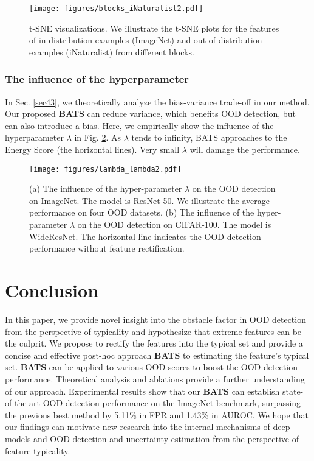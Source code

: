 \documentclass{article}
\begin{document}
\begin{figure}[htbp]
\centering
\texttt{[image: figures/blocks\_iNaturalist2.pdf]}
\vspace{-0.4cm}
\caption{t-SNE visualizations. We illustrate the t-SNE plots for the features of in-distribution examples (ImageNet) and out-of-distribution examples (iNaturalist) from different blocks.}
\label{img:blocks_inaturalist}
\end{figure}

\subsubsection{The influence of the hyperparameter}\label{sec:influence}

In Sec. \ref{sec43}, we theoretically analyze the bias-variance trade-off in our method. 
{Our proposed \textbf{BATS} can reduce variance, which benefits OOD detection, but can also introduce a bias.}
Here, we empirically show the influence of the hyperparameter $\lambda$ in Fig. \ref{img:lambda_lambda}. As $\lambda$ tends to infinity, BATS approaches to the Energy Score (the horizontal lines). Very small $\lambda$ will damage the performance. 

\begin{figure}[htbp]
\centering
\texttt{[image: figures/lambda\_lambda2.pdf]}
\vspace{-0.3cm}
\caption{(a) The influence of the hyper-parameter $\lambda$ on the OOD detection on ImageNet. The model is ResNet-50. We illustrate the average performance on four OOD datasets. (b) The influence of the hyper-parameter $\lambda$ on the OOD detection on CIFAR-100. The model is WideResNet. The horizontal line indicates the OOD detection performance without feature rectification.}
\vspace{-0.3cm}
\label{img:lambda_lambda}
\end{figure}





\section{Conclusion}\label{Conclusion}

In this paper, we provide novel insight into the obstacle factor in OOD detection from the perspective of typicality and hypothesize that extreme features can be the culprit.
We propose to rectify the features into the typical set and provide a concise and effective post-hoc approach \textbf{BATS} to estimating the feature's typical set. \textbf{BATS} can be applied to various OOD scores to boost the OOD detection performance. Theoretical analysis and ablations provide a further understanding of our approach.
Experimental results show that our \textbf{BATS} can establish state-of-the-art OOD detection performance on the ImageNet benchmark, surpassing the previous best method by 5.11$\%$ in FPR and 1.43$\%$ in AUROC.
We hope that our findings can motivate new research into the internal mechanisms of deep models and OOD detection and uncertainty estimation from the perspective of feature typicality.
\end{document}
